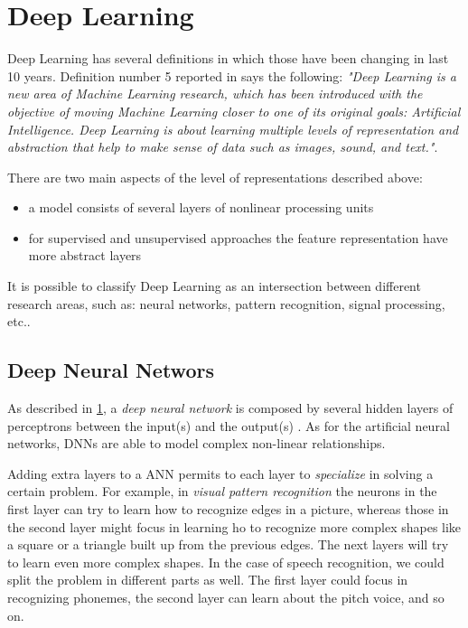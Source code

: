 \section{Deep Learning}
\label{sec:deep_learning}
Deep Learning has several definitions in which those have been changing in last 10 years. Definition number 5 reported in \cite{deng2014deep} says the following: \textit{"Deep Learning is a new area of Machine Learning research, which has been introduced with the objective of moving Machine Learning closer to one of its original goals: Artificial Intelligence. Deep Learning is about learning multiple levels of representation and abstraction that help to make sense of data such as images, sound, and text."}.

\noindent There are two main aspects of the level of representations described above:
\begin{itemize}
    \item[1)] a model consists of several layers of nonlinear processing units
    \item[2)] for supervised and unsupervised approaches the feature representation have more abstract layers
\end{itemize}
\noindent It is possible to classify Deep Learning as an intersection between different research areas, such as: neural networks, pattern recognition, signal processing, etc..\cite{deng2014deep}

\subsection{Deep Neural Networs}
As described in \ref{sec:deep_learning}, a \textit{deep neural network} is composed by several hidden layers of perceptrons between the input(s) and the output(s) \cite{bengio2009learning}. As for the artificial neural networks, DNNs are able to model complex non-linear relationships. \cite{deep_learning_wiki}

\noindent Adding extra layers to a ANN permits to each layer to \textit{specialize} in solving a certain problem. For example, in \textit{visual pattern recognition} the neurons in the first layer can try to learn how to recognize edges in a picture, whereas those in the second layer might focus in learning ho to recognize more complex shapes like a square or a triangle built up from the previous edges. The next layers will try to learn even more complex shapes. In the case of speech recognition, we could split the problem in different parts as well. The first layer could focus in recognizing phonemes, the second layer can learn about the pitch voice, and so on.

